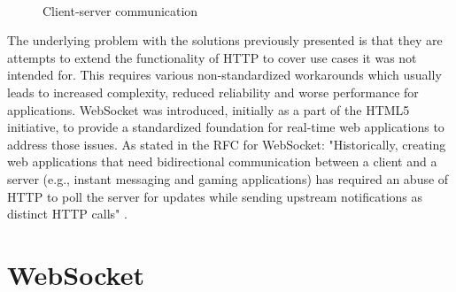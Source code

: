 \\
\begin{figure}[h!]
	\centering
	 \hfill
	\caption{Client-server communication}
\end{figure}

\noindent
The underlying problem with the solutions previously presented is that they are attempts to extend the functionality of HTTP to cover use cases it was not intended for. This requires various non-standardized workarounds which usually leads to increased complexity, reduced reliability and worse performance for applications. WebSocket was introduced, initially as a part of the HTML5 initiative, to provide a standardized foundation for real-time web applications to address those issues. As stated in the RFC for WebSocket: "Historically, creating web applications that need bidirectional communication between a client and a server (e.g., instant messaging and gaming applications) has required an abuse of HTTP to poll the server for updates while sending upstream notifications as distinct HTTP calls" \cite{fette2011websocket}.

\section{WebSocket}

